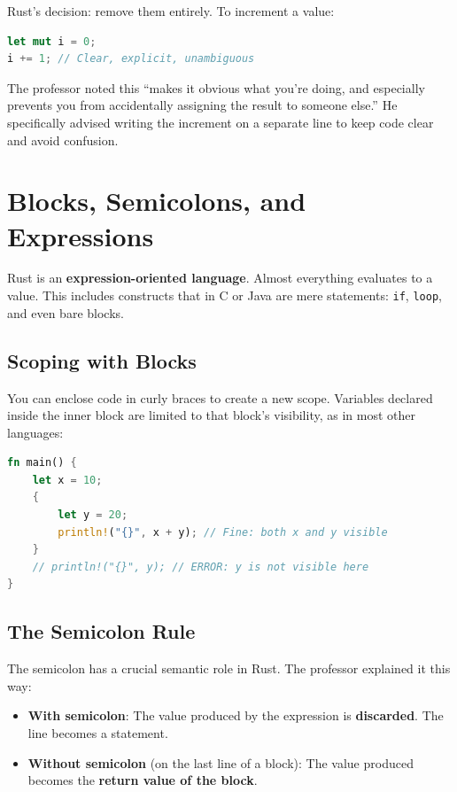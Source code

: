 Rust's decision: remove them entirely. To increment a value:

\begin{lstlisting}[language=Rust]
let mut i = 0;
i += 1; // Clear, explicit, unambiguous
\end{lstlisting}

The professor noted this ``makes it obvious what you're doing, and especially prevents you from accidentally assigning the result to someone else.'' He specifically advised writing the increment on a separate line to keep code clear and avoid confusion.

\section{Blocks, Semicolons, and Expressions}

Rust is an \textbf{expression-oriented language}. Almost everything evaluates to a value. This includes constructs that in C or Java are mere statements: \texttt{if}, \texttt{loop}, and even bare blocks.

\subsection{Scoping with Blocks}

You can enclose code in curly braces to create a new scope. Variables declared inside the inner block are limited to that block's visibility, as in most other languages:

\begin{lstlisting}[language=Rust]
fn main() {
    let x = 10;
    {
        let y = 20;
        println!("{}", x + y); // Fine: both x and y visible
    }
    // println!("{}", y); // ERROR: y is not visible here
}
\end{lstlisting}

\subsection{The Semicolon Rule}

The semicolon has a crucial semantic role in Rust. The professor explained it this way:

\begin{itemize}
    \item \textbf{With semicolon}: The value produced by the expression is \textbf{discarded}. The line becomes a statement.
    \item \textbf{Without semicolon} (on the last line of a block): The value produced becomes the \textbf{return value of the block}.
\end{itemize}

